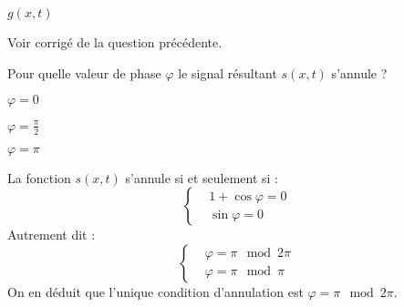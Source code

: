 \begin{minipage}{0.67\linewidth}
\begin{multicols}{2}

	\begin{enonce}
	$g\left(x,t\right)$
	\end{enonce}


	\begin{corrige}
	Voir corrigé de la question précédente.
	\end{corrige}

	\end{multicols}

\end{minipage}

\clearpage

\vspace*{0.4cm}
\begin{enonce}
	Pour quelle valeur de phase $\varphi$ le signal résultant $s\left(x,t\right)$ s'annule ? 
	
	\begin{listeQCM3Colonnes}
	\item $\varphi=0$
	\item $\varphi=\frac{\pi}{2}$
	\item $\varphi=\pi$
	\end{listeQCM3Colonnes}
	\smallskip
\end{enonce}

\reponse{\reponseC{}}

\begin{corrige}
	La fonction $s\left(x,t\right)$ s'annule si et seulement si :
	\begin{equation*}
		\begin{cases}
		& 1+ \cos \varphi = 0 \\
		& \sin \varphi = 0
		\end{cases}
	\end{equation*}
Autrement dit :
\begin{equation*}
	\begin{cases}
		& \varphi = \pi \mod 2\pi \\
		& \varphi = \pi \mod \pi
	\end{cases}
\end{equation*}
	On en déduit que l'unique condition d'annulation est $\varphi = \pi \mod 2\pi$.
\end{corrige}

